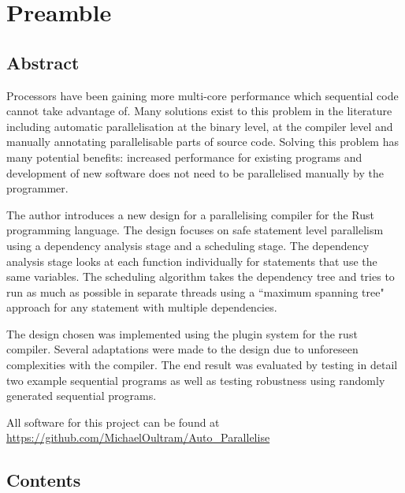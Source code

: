 \chapter{Preamble}
\section{Abstract}
Processors have been gaining more multi-core performance which sequential code cannot take advantage of. Many solutions exist to this problem in the literature including automatic parallelisation at the binary level, at the compiler level and manually annotating parallelisable parts of source code. Solving this problem has many potential benefits: increased performance for existing programs and development of new software does not need to be parallelised manually by the programmer.

The author introduces a new design for a parallelising compiler for the Rust programming language. The design focuses on safe statement level parallelism using a dependency analysis stage and a scheduling stage. The dependency analysis stage looks at each function individually for statements that use the same variables. The scheduling algorithm takes the dependency tree and tries to run as much as possible in separate threads using a ``maximum spanning tree" approach for any statement with multiple dependencies.

The design chosen was implemented using the plugin system for the rust compiler. Several adaptations were made to the design due to unforeseen complexities with the compiler. The end result was evaluated by testing in detail two example sequential programs as well as testing robustness using randomly generated sequential programs. 

\begin{center}
All software for this project can be found at \\
\url{https://github.com/MichaelOultram/Auto\_Parallelise}
\end{center}

\newpage
\section{Contents}
\makeatletter
\newcommand*{\toccontents}{}
\makeatother
\toccontents
